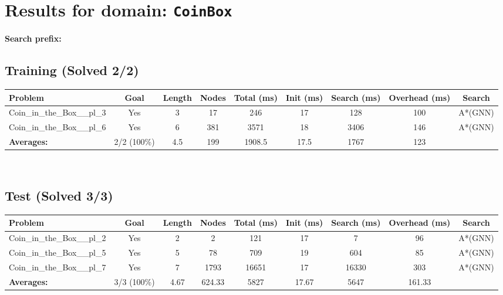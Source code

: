 \documentclass{article}
\begin{document}
\section*{Results for domain: \texttt{CoinBox}}
\textbf{Search prefix:} 
\\[0.5cm]
\subsection*{Training (Solved 2/2)}
\begin{tabular}{lcccccccc}
\toprule
Problem & Goal & Length & Nodes & Total (ms) & Init (ms) & Search (ms) & Overhead (ms) & Search \\
\midrule
Coin\_in\_the\_Box\_\_pl\_3 & Yes & 3 & 17 & 246 & 17 & 128 & 100 & A*(GNN) \\
Coin\_in\_the\_Box\_\_pl\_6 & Yes & 6 & 381 & 3571 & 18 & 3406 & 146 & A*(GNN) \\
\textbf{Averages:} & 2/2 (100\%) & 4.5 & 199 & 1908.5 & 17.5 & 1767 & 123 & \\
\bottomrule
\end{tabular}
\\[0.7cm]
\subsection*{Test (Solved 3/3)}
\begin{tabular}{lcccccccc}
\toprule
Problem & Goal & Length & Nodes & Total (ms) & Init (ms) & Search (ms) & Overhead (ms) & Search \\
\midrule
Coin\_in\_the\_Box\_\_pl\_2 & Yes & 2 & 2 & 121 & 17 & 7 & 96 & A*(GNN) \\
Coin\_in\_the\_Box\_\_pl\_5 & Yes & 5 & 78 & 709 & 19 & 604 & 85 & A*(GNN) \\
Coin\_in\_the\_Box\_\_pl\_7 & Yes & 7 & 1793 & 16651 & 17 & 16330 & 303 & A*(GNN) \\
\textbf{Averages:} & 3/3 (100\%) & 4.67 & 624.33 & 5827 & 17.67 & 5647 & 161.33 & \\
\bottomrule
\end{tabular}
\\[0.7cm]
\end{document}
